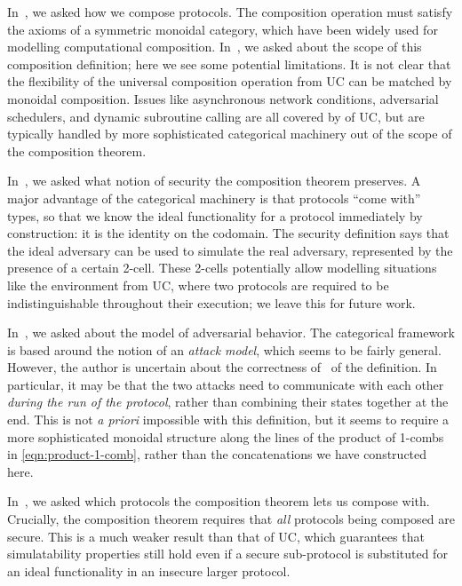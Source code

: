 In~, we asked how we compose protocols. The
composition operation must satisfy the axioms of a symmetric monoidal category,
which have been widely used for modelling computational composition.
In~, we asked about the scope of this
composition definition; here we see some potential limitations. It is not clear
that the flexibility of the universal composition operation from UC can be
matched by monoidal composition. Issues like asynchronous network conditions,
adversarial schedulers, and dynamic subroutine calling are all covered by
of UC, but are typically handled by more sophisticated categorical machinery out
of the scope of the composition theorem.

In~, we asked what notion of security the
composition theorem preserves. A major advantage of the categorical machinery is
that protocols ``come with'' types, so that we know the ideal functionality for
a protocol immediately by construction: it is the identity on the codomain. The
security definition says that the ideal adversary can be used to simulate the
real adversary, represented by the presence of a certain 2-cell. These 2-cells
potentially allow modelling situations like the environment from UC, where two
protocols are required to be indistinguishable throughout their execution; we
leave this for future work.

In~, we asked about the model of adversarial
behavior. The categorical framework is based around the notion of an
\emph{attack model}, which seems to be fairly general. However, the author is
uncertain about the correctness of~ of the
definition. In particular, it may be that the two attacks need to communicate
with each other \emph{during the run of the protocol}, rather than combining
their states together at the end. This is not \emph{a priori} impossible with
this definition, but it seems to require a more sophisticated monoidal structure
along the lines of the product of 1-combs in
\eqref{eqn:product-1-comb}, rather than the concatenations we
have constructed here.

In~, we asked which protocols the composition
theorem lets us compose with. Crucially, the composition theorem requires that
\emph{all} protocols being composed are secure. This is a much weaker result
than that of UC, which guarantees that simulatability properties still hold even
if a secure sub-protocol is substituted for an ideal functionality in an
insecure larger protocol.

